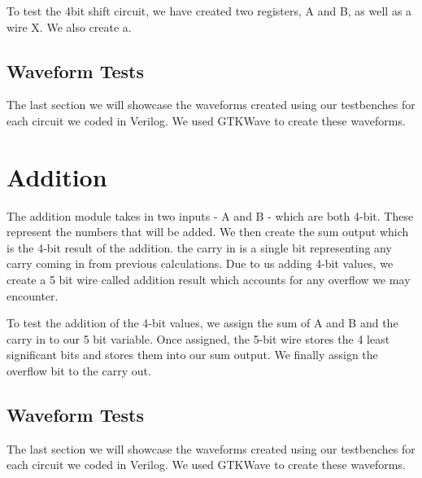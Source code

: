 \documentclass[12pt]{article}
\begin{document}


To test the 4bit shift circuit, we have created two registers, A and B, as well as a wire X. We also create a.




\subsection{Waveform Tests}

The last section we will showcase the waveforms created using our testbenches for each circuit we coded in Verilog. We used GTKWave to create these waveforms.










\section{Addition}
The addition module takes in two inputs - A and B - which are both 4-bit. These represent the numbers that will be added. We then create the sum output which is the 4-bit result of the addition. the carry in is a single bit representing any carry coming in from previous calculations. Due to us adding 4-bit values, we create a 5 bit wire called addition result which accounts for any overflow we may encounter. 


To test the addition of the 4-bit values, we assign the sum of A and B and the carry in to our 5 bit variable. Once assigned, the 5-bit wire stores the 4 least significant bits and stores them into our sum output. We finally assign the overflow bit to the carry out.








\subsection{Waveform Tests}

The last section we will showcase the waveforms created using our testbenches for each circuit we coded in Verilog. We used GTKWave to create these waveforms.
\end{document}
